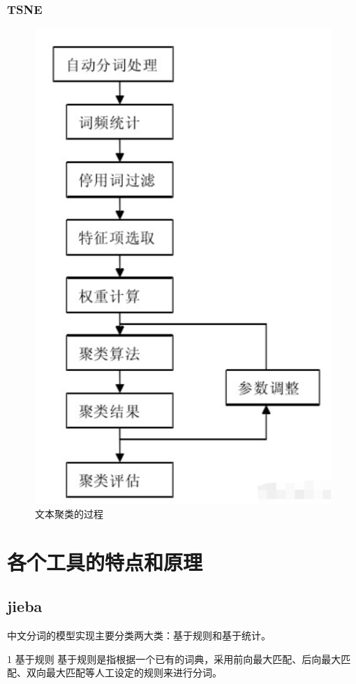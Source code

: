 \documentclass[UTF8]{ctexart}
\begin{document}
\subsubsection{TSNE}
\begin{figure}[ht]
\centering
\includegraphics[scale=0.75]{NPLprocess.png}
\caption{文本聚类的过程}
\end{figure}

\section{各个工具的特点和原理}
\subsection{jieba}
中文分词的模型实现主要分类两大类：基于规则和基于统计。

1 基于规则
基于规则是指根据一个已有的词典，采用前向最大匹配、后向最大匹配、双向最大匹配等人工设定的规则来进行分词。
\end{document}
